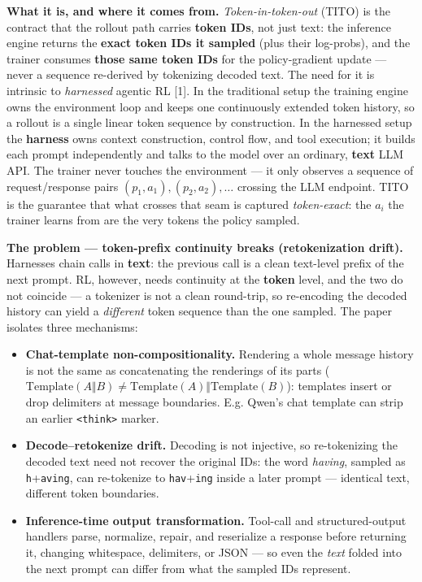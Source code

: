 \documentclass[
  paper=a4,
  ,captions=tableheading
]{scrartcl}
\providecommand{\tightlist}{%
  \setlength{\itemsep}{0pt}\setlength{\parskip}{0pt}}
\begin{document}
\textbf{What it is, and where it comes from.} \emph{Token-in-token-out}
(TITO) is the contract that the rollout path carries \textbf{token IDs},
not just text: the inference engine returns the \textbf{exact token IDs
it sampled} (plus their log-probs), and the trainer consumes
\textbf{those same token IDs} for the policy-gradient update --- never a
sequence re-derived by tokenizing decoded text. The need for it is
intrinsic to \emph{harnessed} agentic RL {[}1{]}. In the traditional
setup the training engine owns the environment loop and keeps one
continuously extended token history, so a rollout is a single linear
token sequence by construction. In the harnessed setup the
\textbf{harness} owns context construction, control flow, and tool
execution; it builds each prompt independently and talks to the model
over an ordinary, \textbf{text} LLM API. The trainer never touches the
environment --- it only observes a sequence of request/response pairs
\((p_1,a_1),(p_2,a_2),\dots\) crossing the LLM endpoint. TITO is the
guarantee that what crosses that seam is captured \emph{token-exact}:
the \(a_i\) the trainer learns from are the very tokens the policy
sampled.

\textbf{The problem --- token-prefix continuity breaks (retokenization
drift).} Harnesses chain calls in \textbf{text}: the previous call is a
clean text-level prefix of the next prompt. RL, however, needs
continuity at the \textbf{token} level, and the two do not coincide ---
a tokenizer is not a clean round-trip, so re-encoding the decoded
history can yield a \emph{different} token sequence than the one
sampled. The paper isolates three mechanisms:

\begin{itemize}
\tightlist
\item
  \textbf{Chat-template non-compositionality.} Rendering a whole message
  history is not the same as concatenating the renderings of its parts
  (\(\mathrm{Template}(A \Vert B) \neq \mathrm{Template}(A)\Vert\mathrm{Template}(B)\)):
  templates insert or drop delimiters at message boundaries. E.g. Qwen's
  chat template can strip an earlier
  \texttt{\textless{}think\textgreater{}} marker.
\item
  \textbf{Decode--retokenize drift.} Decoding is not injective, so
  re-tokenizing the decoded text need not recover the original IDs: the
  word \emph{having}, sampled as \texttt{h}+\texttt{aving}, can
  re-tokenize to \texttt{hav}+\texttt{ing} inside a later prompt ---
  identical text, different token boundaries.
\item
  \textbf{Inference-time output transformation.} Tool-call and
  structured-output handlers parse, normalize, repair, and reserialize a
  response before returning it, changing whitespace, delimiters, or JSON
  --- so even the \emph{text} folded into the next prompt can differ
  from what the sampled IDs represent.
\end{itemize}
\end{document}
